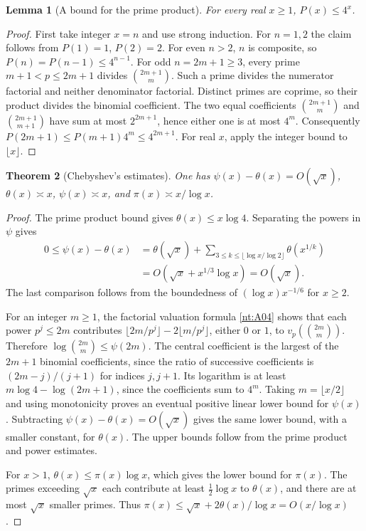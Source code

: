 \documentclass[11pt,oneside,openany]{book}
\theoremstyle{plain}
\newtheorem{theorem}{Theorem}[chapter]
\newtheorem{lemma}[theorem]{Lemma}
\theoremstyle{definition}
\theoremstyle{remark}
\begin{document}
\begin{lemma}[A bound for the prime product]\label{nt:prime-product-bound}
For every real \(x\ge1\), \(P(x)\le4^x\).
\end{lemma}

\begin{proof}
First take integer \(x=n\) and use strong induction. For \(n=1,2\)
the claim follows from \(P(1)=1\), \(P(2)=2\). For even \(n>2\),
\(n\) is composite, so \(P(n)=P(n-1)\le4^{n-1}\).
For odd \(n=2m+1\ge3\), every prime \(m+1<p\le 2m+1\) divides
\(\binom{2m+1}{m}\). Such a prime divides the numerator factorial
and neither denominator factorial. Distinct primes are coprime,
so their product divides the binomial coefficient. The two equal
coefficients \(\binom{2m+1}{m}\) and \(\binom{2m+1}{m+1}\) have sum
at most \(2^{2m+1}\), hence either one is at most \(4^m\).
Consequently \(P(2m+1)\le P(m+1)4^m\le4^{2m+1}\).
For real \(x\), apply the integer bound to \(\lfloor x\rfloor\).
\end{proof}

\begin{theorem}[Chebyshev's estimates]\label{nt:C08}
One has \(\psi(x)-\theta(x)=O(\sqrt{x})\),
\(\theta(x)\asymp x\), \(\psi(x)\asymp x\), and
\(\pi(x)\asymp x/\log x\).
\end{theorem}

\begin{proof}
The prime product bound gives \(\theta(x)\le x\log4\). Separating
the powers in \(\psi\) gives
\begin{align*}
 0\le\psi(x)-\theta(x)
 &=\theta(\sqrt{x})+
   \sum_{3\le k\le \lfloor\log x/\log 2\rfloor}\theta(x^{1/k})\\
 &=O(\sqrt{x}+x^{1/3}\log x)=O(\sqrt{x}).
\end{align*}
The last comparison follows from the boundedness of
\((\log x)x^{-1/6}\) for \(x\ge2\).

For an integer \(m\ge1\), the factorial valuation formula
\ref{nt:A04} shows that each power \(p^j\le2m\) contributes
\(\lfloor 2m/p^j\rfloor-2\lfloor m/p^j\rfloor\), either \(0\)
or \(1\), to \(v_p\!\left(\binom{2m}{m}\right)\). Therefore
\(\log\binom{2m}{m}\le\psi(2m)\). The central coefficient is the
largest of the \(2m+1\) binomial coefficients, since the ratio of
successive coefficients is \((2m-j)/(j+1)\) for indices \(j,j+1\).
Its logarithm is at least \(m\log4-\log(2m+1)\), since the
coefficients sum to \(4^m\). Taking \(m=\lfloor x/2\rfloor\) and
using monotonicity proves an eventual positive linear lower bound
for \(\psi(x)\). Subtracting \(\psi(x)-\theta(x)=O(\sqrt{x})\)
gives the same lower bound, with a smaller constant, for \(\theta(x)\).
The upper bounds follow from the prime product and power estimates.

For \(x>1\), \(\theta(x)\le \pi(x)\log x\), which gives the lower
bound for \(\pi(x)\). The primes exceeding \(\sqrt{x}\) each contribute
at least \(\tfrac12\log x\) to \(\theta(x)\), and there are at most
\(\sqrt{x}\) smaller primes. Thus
\(\pi(x)\le\sqrt{x}+2\theta(x)/\log x=O(x/\log x)\).
\end{proof}
\end{document}

